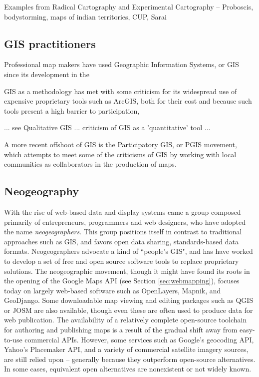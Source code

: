 \documentclass[11pt]{report}
\begin{document}
Examples from Radical Cartography and Experimental Cartography -- Proboscis, bodystorming, maps of indian territories, CUP, Sarai 

\subsection{GIS practitioners}

Professional map makers have used Geographic Information Systems, or GIS since its development in the 


GIS as a methodology has met with some criticism for its widespread use of expensive proprietary tools such as ArcGIS, both for their cost and because such tools present a high barrier to participation, 

... see Qualitative GIS ... criticism of GIS as a 'quantitative' tool ... 

A more recent offshoot of GIS is the Participatory GIS, or PGIS movement, which attempts to meet some of the criticisms of GIS by working with local communities as collaborators in the production of maps. 

\subsection{Neogeography}

With the rise of web-based data and display systems came a group composed primarily of entrepreneurs, programmers and web designers, who have adopted the name \emph{neogeographers}. This group positions itself in contrast to traditional approaches such as GIS, and favors open data sharing, standards-based data formats. Neogeographers advocate a kind of ``people's GIS", and has have worked to develop a set of free and open source software tools to replace proprietary solutions. The neogeographic movement, though it might have found its roots in the opening of the Google Maps API (see Section \ref{sec:webmapping}), focuses today on largely web-based software such as OpenLayers, Mapnik, and GeoDjango. Some downloadable map viewing and editing packages such as QGIS or JOSM are also available, though even these are often used to produce data for web publication. The availability of a relatively complete open-source toolchain for authoring and publishing maps is a result of the gradual shift away from easy-to-use commercial APIs. \cite{rana2009neogeography} However, some services such as Google's geocoding API, Yahoo's Placemaker API, and a variety of commercial satellite imagery sources, are still relied upon -- generally because they outperform open-source alternatives. In some cases, equivalent open alternatives are nonexistent or not widely known.
\end{document}
